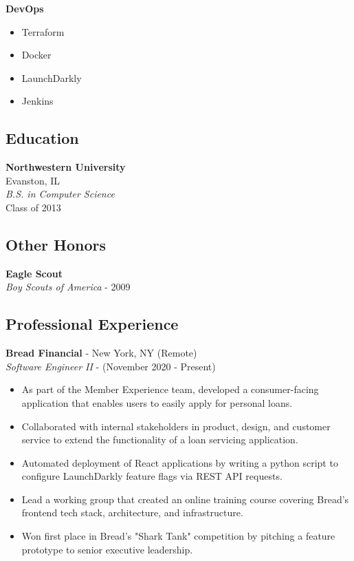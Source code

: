 \documentclass[10pt]{article}
\begin{document}
\begin{paracol}{2}
    \noindent \textbf{DevOps}
    \begin{itemize}
        \item Terraform
        \item Docker
        \item LaunchDarkly
        \item Jenkins
    \end{itemize}

    \subsection*{Education}
    \textbf{Northwestern University} \\
    Evanston, IL \\
    \textit{B.S. in Computer Science}  \\
    {\footnotesize{Class of 2013}}

    \subsection*{Other Honors}
    \textbf{Eagle Scout} \\
    \textit{Boy Scouts of America} - {\footnotesize{2009}}

    \switchcolumn

    \subsection*{Professional Experience}

    \textbf{Bread Financial} - New York, NY (Remote) \\
    \textit{Software Engineer II} - {\footnotesize{(November 2020 - Present)}}
    \begin{itemize}
        \item As part of the Member Experience team, developed a consumer-facing application that enables users to easily apply for personal loans.
        \item Collaborated with internal stakeholders in product, design, and customer service to extend the functionality of a loan servicing application.
        \item Automated deployment of React applications by writing a python script to configure LaunchDarkly feature flags via REST API requests.
        \item Lead a working group that created an online training course covering Bread's frontend tech stack, architecture, and infrastructure.
        \item Won first place in Bread's "Shark Tank" competition by pitching a feature prototype to senior executive leadership.
    \end{itemize}


\end{paracol}
\end{document}
